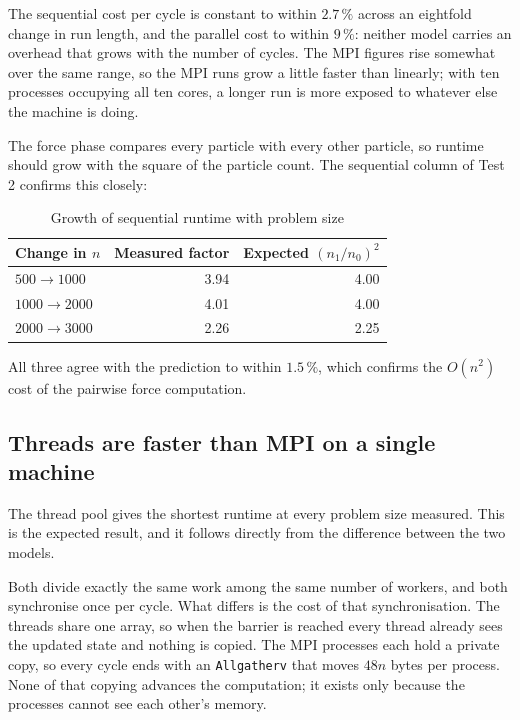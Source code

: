 \documentclass[sigconf]{acmart}
\begin{document}
The sequential cost per cycle is constant to within $2.7\,\%$ across an eightfold change in run
length, and the parallel cost to within $9\,\%$: neither model carries an overhead that grows with
the number of cycles. The MPI figures rise somewhat over the same range, so the MPI runs grow a
little faster than linearly; with ten processes occupying all ten cores, a longer run is more
exposed to whatever else the machine is doing.

The force phase compares every particle with every other particle, so runtime should grow with the
square of the particle count. The sequential column of Test 2 confirms this closely:

\begin{table}[h]
\centering
\caption{Growth of sequential runtime with problem size}
\begin{tabular}{@{}lrr@{}}
\toprule
Change in $n$ & Measured factor & Expected $(n_1/n_0)^2$ \\
\midrule
$500 \rightarrow 1000$  & 3.94 & 4.00 \\
$1000 \rightarrow 2000$ & 4.01 & 4.00 \\
$2000 \rightarrow 3000$ & 2.26 & 2.25 \\
\bottomrule
\end{tabular}
\end{table}

All three agree with the prediction to within $1.5\,\%$, which confirms the $O(n^2)$ cost of the
pairwise force computation.

\subsection{Threads are faster than MPI on a single machine}
\label{sec:mpi}

The thread pool gives the shortest runtime at every problem size measured. This is the expected
result, and it follows directly from the difference between the two models.

Both divide exactly the same work among the same number of workers, and both synchronise once per
cycle. What differs is the cost of that synchronisation. The threads share one array, so when the
barrier is reached every thread already sees the updated state and nothing is copied. The MPI
processes each hold a private copy, so every cycle ends with an \texttt{Allgatherv} that moves $48n$
bytes per process. None of that copying advances the computation; it exists only because the
processes cannot see each other's memory.
\end{document}
